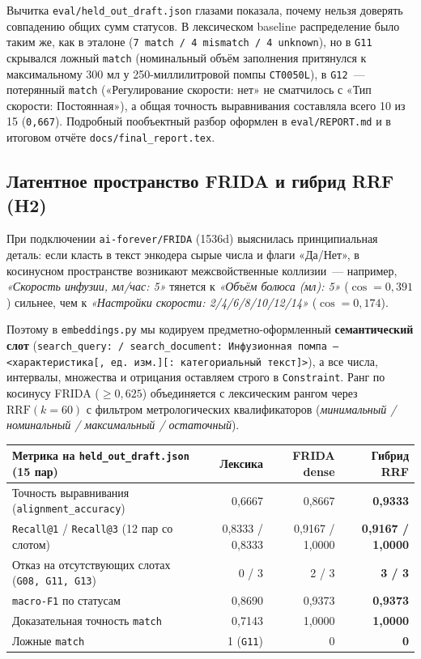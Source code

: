 \documentclass[11pt,a4paper]{article}
\begin{document}
Вычитка \texttt{eval/held\_out\_draft.json} глазами показала, почему нельзя доверять совпадению общих сумм статусов. В лексическом baseline распределение было таким же, как в эталоне (\texttt{7 match / 4 mismatch / 4 unknown}), но в \texttt{G11} скрывался ложный \texttt{match} (номинальный объём заполнения притянулся к максимальному 300 мл у 250-миллилитровой помпы \texttt{CT0050L}), в \texttt{G12}~--- потерянный \texttt{match} («Регулирование скорости: нет» не сматчилось с «Тип скорости: Постоянная»), а общая точность выравнивания составляла всего 10 из 15 (\texttt{0,667}). Подробный пообъектный разбор оформлен в \nolinkurl{eval/REPORT.md} и в итоговом отчёте \nolinkurl{docs/final_report.tex}.

\subsection{Латентное пространство FRIDA и гибрид RRF (H2)}

При подключении \texttt{ai-forever/FRIDA} (1536d) выяснилась принципиальная деталь: если класть в текст энкодера сырые числа и флаги «Да/Нет», в косинусном пространстве возникают межсвойственные коллизии~--- например, \emph{«Скорость инфузии, мл/час: 5»} тянется к \emph{«Объём болюса (мл): 5»} ($\cos = 0{,}391$) сильнее, чем к \emph{«Настройки скорости: 2/4/6/8/10/12/14»} ($\cos = 0{,}174$).

Поэтому в \texttt{embeddings.py} мы кодируем предметно-оформленный \textbf{семантический слот} (\texttt{search\_query: / search\_document: Инфузионная помпа --- <характеристика[, ед.\ изм.][: категориальный текст]>}), а все числа, интервалы, множества и отрицания оставляем строго в \texttt{Constraint}. Ранг по косинусу FRIDA ($\ge 0{,}625$) объединяется с лексическим рангом через $\mathrm{RRF}(k=60)$ с фильтром метрологических квалификаторов (\emph{минимальный / номинальный / максимальный / остаточный}).

\begin{center}
\begin{tabular}{lrrr}
\toprule
Метрика на \texttt{held\_out\_draft.json} (15 пар) & Лексика & FRIDA dense & Гибрид RRF \\
\midrule
Точность выравнивания (\texttt{alignment\_accuracy}) & 0,6667 & 0,8667 & \textbf{0,9333} \\
\texttt{Recall@1} / \texttt{Recall@3} (12 пар со слотом) & 0,8333 / 0,8333 & 0,9167 / 1,0000 & \textbf{0,9167 / 1,0000} \\
Отказ на отсутствующих слотах (\texttt{G08, G11, G13}) & 0 / 3 & 2 / 3 & \textbf{3 / 3} \\
\texttt{macro-F1} по статусам & 0,8690 & 0,9373 & \textbf{0,9373} \\
Доказательная точность \texttt{match} & 0,7143 & 1,0000 & \textbf{1,0000} \\
Ложные \texttt{match} & 1 (\texttt{G11}) & 0 & \textbf{0} \\
\bottomrule
\end{tabular}
\end{center}
\end{document}

